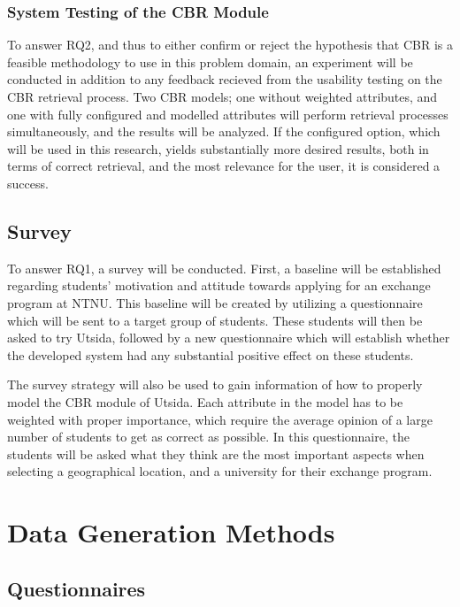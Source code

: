 \subsubsection{System Testing of the CBR Module}

To answer RQ2, and thus to either confirm or reject the hypothesis that CBR is a feasible methodology to use in this problem domain, an experiment will be conducted in addition to any feedback recieved from the usability testing on the CBR retrieval process. Two CBR models; one without weighted attributes, and one with fully configured and modelled attributes will perform retrieval processes simultaneously, and the results will be analyzed. If the configured option, which will be used in this research, yields substantially more desired results, both in terms of correct retrieval, and the most relevance for the user, it is considered a success.

\subsection{Survey}

To answer RQ1, a survey will be conducted. First, a baseline will be established regarding students’ motivation and attitude towards applying for an exchange program at NTNU. This baseline will be created by utilizing a questionnaire which will be sent to a target group of students. These students will then be asked to try Utsida, followed by a new questionnaire which will establish whether the developed system had any substantial positive effect on these students.

The survey strategy will also be used to gain information of how to properly model the CBR module of Utsida. Each attribute in the model has to be weighted with proper importance, which require the average opinion of a large number of students to get as correct as possible. In this questionnaire, the students will be asked what they think are the most important aspects when selecting a geographical location, and a university for their exchange program.


\section{Data Generation Methods}

\subsection{Questionnaires}

